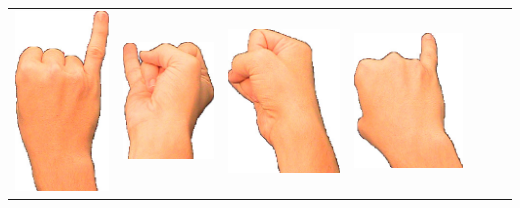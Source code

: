 \documentclass{article}
\begin{document}
\begin{center}
\begin{tabular}{r*{6}{c}}
\includegraphics[scale=0.1]{images/06-06-3.jpg}&
\includegraphics[scale=0.1]{images/06-06-4.jpg}&
\includegraphics[scale=0.1]{images/06-06-5.jpg}&
\includegraphics[scale=0.1]{images/06-06-6.jpg}\\

\end{tabular}
\end{center}
\end{document}
